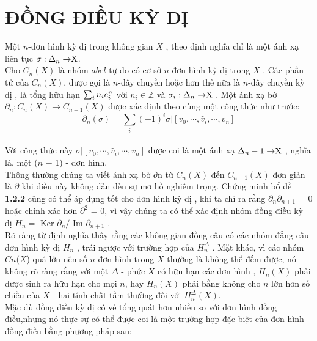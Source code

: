\chapter{ĐỒNG ĐIỀU KỲ DỊ}

\indent Một \(n\)-đơn hình kỳ dị trong không gian \(X\) , theo định nghĩa chỉ là một ánh xạ liên tục  \(\sigma : \Delta_n\rightarrow$X$\). \\
\indent Cho \(C_n(X)\) là nhóm \(abel\) tự do có cơ sở  \(n\)-đơn hình kỳ dị trong \(X\) . Các phần tử của \(C_n(X)\), được gọi là \(n\)-dây chuyền hoặc hơn thế nữa là \(n\)-dây chuyền kỳ dị , là tổng hữu hạn \(\sum_{i}n_i$$e_i^n$$\) với \(n_i \in \mathds{Z}\) và \(\sigma_i : \Delta_n\rightarrow$X$\) . Một ánh xạ bờ  \(\partial_n : C_n(X)\rightarrow C_{n-1} (X)\) được xác định theo cùng một công thức như trước:
\[\partial_n(\sigma) = \sum_{i}(-1)^i\sigma|[v_0, \cdots,\hat{v}_i,\cdots,v_n]\] \\
\indent Với công thức này \(\sigma|[v_0, \cdots,\hat{v}_i,\cdots,v_n]\) được coi là một ánh xạ \(\Delta_{n}-1\rightarrow$X$\) , nghĩa là, một (\(n\) − 1) - đơn hình. \\
\indent Thông thường chúng ta viết ánh xạ bờ ∂n từ \(C_n(X)\) đến \(C_{n−1} (X)\) đơn giản là \(\partial\) khi
điều này không dẫn đến sự mơ hồ nghiêm trọng. Chứng minh bổ đề \textbf{1.2.2} cũng có thể áp dụng tốt cho đơn hình kỳ dị , khi ta chỉ ra rằng \(\partial_{n}\partial_{n+1}\) = 0 hoặc chính xác hơn \(\partial^2\) = 0, vì vậy chúng ta có thể xác định nhóm đồng điều kỳ dị  \(H_n =\) Ker \(\partial_n / \) Im \(\partial_{n+1}\) . \\
\indent Rõ ràng từ định nghĩa thấy rằng các không gian đồng cấu có các nhóm đẳng cấu đơn hình kỳ dị \(H_n\) , trái ngược với trường hợp của \(H_n^{\Delta}\) . Mặt khác, vì các nhóm \(Cn(X\)) quá lớn nên số \(n\)-đơn hình  trong \(X\) thường là không thể đếm được, nó không rõ ràng rằng với một \(\Delta\) - phức \(X\) có hữu hạn các đơn hình , \(H_n(X)\) phải được sinh ra hữu hạn cho mọi \(n\), hay \(H_n(X)\) phải bằng không cho \(n\) lớn hơn số chiều của \(X\) - hai tính chất tầm thường đối với \(H_n^{\Delta} (X)\). \\
\indent Mặc dù đồng điều kỳ dị có vẻ tổng quát hơn nhiều so với đơn hình đồng điều,nhưng  nó thực sự có thể được coi là một trường hợp đặc biệt của đơn hình đồng điều bằng phương pháp sau:

